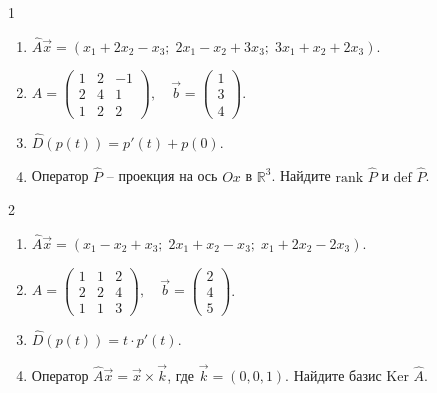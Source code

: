 \documentclass[12pt,a4paper]{article}
\theoremstyle{plain}
\theoremstyle{definition}
\begin{document}
\begin{taskbox}{1}
    \begin{enumerate}
        \item $\hat{A}\vec{x} = (x_1 + 2x_2 - x_3; \; 2x_1 - x_2 + 3x_3; \; 3x_1 + x_2 + 2x_3)$.
        \item $A = \begin{pmatrix} 1 & 2 & -1 \\ 2 & 4 & 1 \\ 1 & 2 & 2 \end{pmatrix}, \quad \vec{b} = \begin{pmatrix} 1 \\ 3 \\ 4 \end{pmatrix}$.
        \item $\hat{D}(p(t)) = p'(t) + p(0)$.
        \item Оператор $\hat{P}$ -- проекция на ось $Ox$ в $\mathbb{R}^3$. Найдите $\text{rank } \hat{P}$ и $\text{def } \hat{P}$.
    \end{enumerate}
\end{taskbox}

\begin{taskbox}{2}
    \begin{enumerate}
        \item $\hat{A}\vec{x} = (x_1 - x_2 + x_3; \; 2x_1 + x_2 - x_3; \; x_1 + 2x_2 - 2x_3)$.
        \item $A = \begin{pmatrix} 1 & 1 & 2 \\ 2 & 2 & 4 \\ 1 & 1 & 3 \end{pmatrix}, \quad \vec{b} = \begin{pmatrix} 2 \\ 4 \\ 5 \end{pmatrix}$.
        \item $\hat{D}(p(t)) = t \cdot p'(t)$.
        \item Оператор $\hat{A}\vec{x} = \vec{x} \times \vec{k}$, где $\vec{k}=(0,0,1)$. Найдите базис $\text{Ker } \hat{A}$.
    \end{enumerate}
\end{taskbox}
\end{document}
